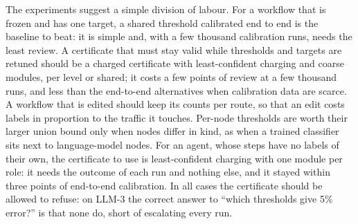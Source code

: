The experiments suggest a simple division of labour. For a workflow that is frozen and has
one target, a shared threshold calibrated end to end is the baseline to beat: it is simple
and, with a few thousand calibration runs, needs the least review. A certificate that must
stay valid while thresholds and targets are retuned should be a charged certificate with
least-confident charging and coarse modules, per level or shared; it costs a few points of
review at a few thousand runs, and less than the end-to-end alternatives when calibration
data are scarce. A workflow that is edited should keep its counts per route, so that an edit
costs labels in proportion to the traffic it touches. Per-node thresholds are worth their
larger union bound only when nodes differ in kind, as when a trained classifier sits next
to language-model nodes. For an agent, whose steps have no labels of their own, the
certificate to use is least-confident charging with one module per role: it needs the
outcome of each run and nothing else, and it stayed within three points of end-to-end
calibration. In all cases the certificate should be allowed to refuse: on LLM-3
the correct answer to ``which thresholds give 5\% error?'' is that none do, short of escalating
every run.
